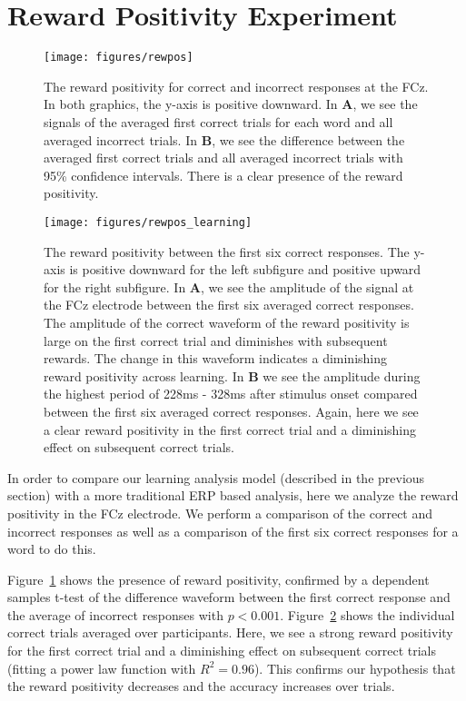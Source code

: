 \section{Reward Positivity Experiment}

\begin{figure}[t]
  \centerline{
    \texttt{[image: figures/rewpos]}
  }
  \caption{
    The reward positivity for correct and incorrect responses at the FCz. In 
    both graphics, the y-axis is positive downward. In {\bf A}, we see the 
    signals of the averaged first correct trials for each word and all averaged 
    incorrect trials. In {\bf B}, we see the difference between the averaged 
    first correct trials and all averaged incorrect trials with 95\% confidence 
    intervals.  There is a clear presence of the reward positivity.
  }
  \label{fig:rewpos}
\end{figure}

\begin{figure}[t]
  \centerline{
    \texttt{[image: figures/rewpos\_learning]}
  }
  \caption{
    The reward positivity between the first six correct responses. The y-axis 
    is positive downward for the left subfigure and positive upward for the 
    right subfigure. In {\bf A}, we see the amplitude of the signal at the FCz 
    electrode between the first six averaged correct responses. The amplitude 
    of the correct waveform of the reward positivity is large on the first 
    correct trial and diminishes with subsequent rewards. The change in this 
    waveform indicates a diminishing reward positivity across learning. In {\bf 
    B} we see the amplitude during the highest period of 228ms - 328ms after 
    stimulus onset compared between the first six averaged correct responses.  
    Again, here we see a clear reward positivity in the first correct trial and 
    a diminishing effect on subsequent correct trials.
  }
  \label{fig:rewpos_learning}
\end{figure}

In order to compare our learning analysis model (described in the previous 
section) with a more traditional ERP based analysis, here we analyze the reward 
positivity in the FCz electrode. We perform a comparison of the correct and 
incorrect responses as well as a comparison of the first six correct responses 
for a word to do this.

Figure~\ref{fig:rewpos} shows the presence of reward positivity, confirmed by a 
dependent samples t-test of the difference waveform between the first correct 
response and the average of incorrect responses with $p < 0.001$.  
Figure~\ref{fig:rewpos_learning} shows the individual correct trials averaged 
over participants. Here, we see a strong reward positivity for the first 
correct trial and a diminishing effect on subsequent correct trials (fitting a 
power law function with $R^2 = 0.96$). This confirms our hypothesis that the 
reward positivity decreases and the \tvt accuracy increases over trials.
